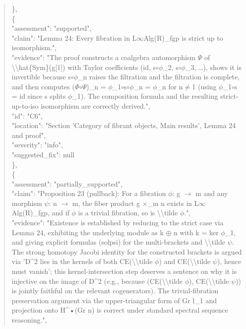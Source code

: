 \documentclass[11pt]{article}
\begin{document}
\begin{quote}
    \},\\
    \{\\
      "assessment": "supported",\\
      "claim": "Lemma 24: Every fibration in L\ensuremath{\infty}Alg(R)\_fgp is strict up to isomorphism.",\\
      "evidence": "The proof constructs a coalgebra automorphism \ensuremath{\Psi} of \textbackslash{}\textbackslash{}hat\{Sym\}(g[1]) with Taylor coefficients (id, s\ensuremath{\circ}\ensuremath{\phi}\_2, s\ensuremath{\circ}\ensuremath{\phi}\_3, …), shows it is invertible because s\ensuremath{\circ}\ensuremath{\phi}\_n raises the filtration and the filtration is complete, and then computes (\ensuremath{\Phi}\ensuremath{\circ}\ensuremath{\Psi})\_n = \ensuremath{\phi}\_1\ensuremath{\circ}s\ensuremath{\circ}\ensuremath{\phi}\_n = \ensuremath{\phi}\_n for n\ensuremath{\ne}1 (using \ensuremath{\phi}\_1\ensuremath{\circ}s = id since s splits \ensuremath{\phi}\_1). The composition formula and the resulting strict-up-to-iso isomorphism are correctly derived.",\\
      "id": "C6",\\
      "location": "Section 'Category of fibrant objects, Main results', Lemma 24 and proof",\\
      "severity": "info",\\
      "suggested\_fix": null\\
    \},\\
    \{\\
      "assessment": "partially\_supported",\\
      "claim": "Proposition 23 (pullback): For a fibration \ensuremath{\phi}: g \ensuremath{\to} m and any morphism \ensuremath{\psi}: n \ensuremath{\to} m, the fiber product g \ensuremath{\times}\_m n exists in L\ensuremath{\infty}Alg(R)\_fgp, and if \ensuremath{\phi} is a trivial fibration, so is \textbackslash{}\textbackslash{}tilde \ensuremath{\phi}.",\\
      "evidence": "Existence is established by reducing to the strict case via Lemma 24, exhibiting the underlying module as k \ensuremath{\oplus} n with k = ker \ensuremath{\phi}\_1, and giving explicit formulas (solpsi) for the multi-brackets and \textbackslash{}\textbackslash{}tilde \ensuremath{\psi}. The strong homotopy Jacobi identity for the constructed brackets is argued via 'D\^{}2 lies in the kernels of both CE(\textbackslash{}\textbackslash{}tilde \ensuremath{\phi}) and CE(\textbackslash{}\textbackslash{}tilde \ensuremath{\psi}), hence must vanish'; this kernel-intersection step deserves a sentence on why it is injective on the image of D\^{}2 (e.g., because (CE(\textbackslash{}\textbackslash{}tilde \ensuremath{\phi}), CE(\textbackslash{}\textbackslash{}tilde \ensuremath{\psi})) is jointly faithful on the relevant cogenerators). The trivial-fibration preservation argument via the upper-triangular form of Gr l\_1 and projection onto H\^{}•(Gr n) is correct under standard spectral sequence reasoning.",\\

\end{quote}
\end{document}

